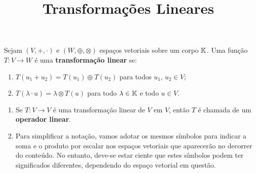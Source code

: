 \documentclass{beamer}
\title{Transformações Lineares}
\author[\autor]{\autor}
\institute[\instituto]{\instituto}
\date{}
\begin{document}
\begin{frame}
	\maketitle
\end{frame}


\begin{frame}
    \begin{definicao}
        Sejam $(V, +, \cdot)$  e $(W, \oplus, \otimes)$  espaços vetoriais sobre um corpo $\mathbb{K}$.  Uma função $T \colon V \to W$  é uma \textbf{transformação linear} se:
        \begin{enumerate}[label={\roman*})]
            \item $T(u_1 + u_2)  = T(u_1)  \oplus T(u_2)$  para todos $u_1$, $u_2 \in V$;

            \vspace*{1.5cm}

            \item $T(\lambda \cdot u)  = \lambda  \otimes T(u)$  para todo $\lambda \in \mathbb{K}$ e todo $u \in V$.
        \end{enumerate}
    \end{definicao}
\end{frame}

\begin{frame}
    \begin{observacoes}
        \begin{enumerate}[label={\roman*})]
            \item Se $T \colon V \to V$ é uma transformação linear  de $V$ em $V$, então  $T$ é chamada de um \textbf{operador linear}.

            \vspace*{1.5cm}

            \item Para simplificar a notação,  vamos adotar os mesmos símbolos para indicar a soma  e o produto por escalar  nos espaços vetoriais que aparecerão no decorrer do conteúdo.  No entanto, deve-se estar ciente que estes símbolos podem ter significados diferentes,  dependendo do espaço vetorial em questão.
        \end{enumerate}
    \end{observacoes}
\end{frame}
\end{document}
